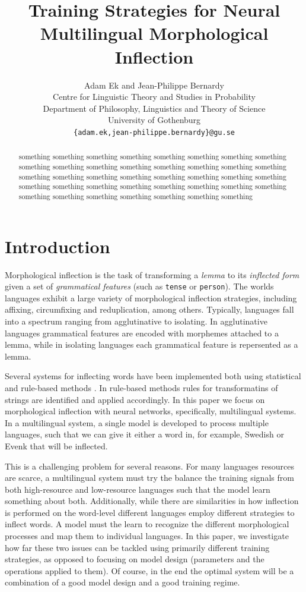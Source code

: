 \documentclass[11pt,a4paper]{article}
\title{Training Strategies for Neural Multilingual Morphological Inflection}
\author{Adam Ek and Jean-Philippe Bernardy \\
	Centre for Linguistic Theory and Studies in Probability \\
	Department of Philosophy, Linguistics and Theory of Science \\
	University of Gothenburg \\
	\texttt{\{adam.ek,jean-philippe.bernardy\}@gu.se} \\}
\date{}
\newcommand\jp[1]{\textbf{JP: #1}}
\begin{document}
\maketitle
\begin{abstract}
something something something something something something
something something something something something something
something something something something something something
something something something something something something
something something something something something something
something something something something something something
something something something 
\end{abstract}

\section{Introduction}


Morphological inflection is the task of transforming a \emph{lemma} to
its \emph{inflected form} given a set of \emph{grammatical features}
(such as \texttt{tense} or \texttt{person}).  The worlds languages
exhibit a large variety of morphological inflection strategies,
including affixing, circumfixing and reduplication, among
others.
Typically, languages
fall into a spectrum ranging from agglutinative to isolating. In
agglutinative languages grammatical features are encoded with
morphemes attached to a lemma, while in isolating languages each
grammatical feature is repersented as a lemma.

Several systems for inflecting words have been implemented both using
statistical \cite{DBLP:conf/eacl/SmitVGK14, kann2016med} and rule-based
methods \cite{DBLP:phd/basesearch/Hulden09}. In rule-based methods rules for
transformatins of strings are identified and applied accordingly. In
this paper we focus on morphological inflection with neural networks,
specifically, multilingual systems. In a multilingual system, a single
model is developed to process multiple languages, such that we can
give it either a word in, for example, Swedish or Evenk that will be
inflected.

This is a challenging problem for several reasons. For many languages
resources are scarce, a multilingual system must try the balance the
training signals from both high-resource and low-resource languages
such that the model learn something about both. Additionally, while
there are similarities in how inflection is performed on the
word-level different languages employ different strategies to inflect
words. A model must the learn to recognize the different morphological
processes and map them to individual languages.  In this paper, we
investigate how far these two issues can be tackled using primarily
different training strategies, as opposed to focusing on model design
(parameters and the operations applied to them).  Of course, in the
end the optimal system will be a combination of a good model design
and a good training regime. 
\end{document}
